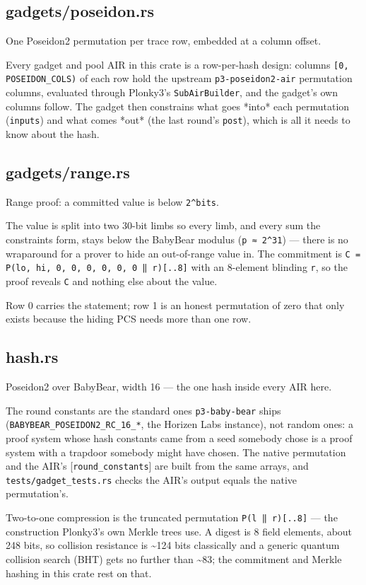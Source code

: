 \documentclass[11pt,a4paper]{article}
\begin{document}
\subsection{gadgets/poseidon.rs}
One Poseidon2 permutation per trace row, embedded at a column offset.

Every gadget and pool AIR in this crate is a row-per-hash design: columns
\texttt{[0, POSEIDON\_COLS)} of each row hold the upstream \texttt{p3-poseidon2-air}
permutation columns, evaluated through Plonky3's \texttt{SubAirBuilder}, and the
gadget's own columns follow. The gadget then constrains what goes *into*
each permutation (\texttt{inputs}) and what comes *out* (the last round's
\texttt{post}), which is all it needs to know about the hash.

\subsection{gadgets/range.rs}
Range proof: a committed value is below \texttt{2\textasciicircum{}bits}.

The value is split into two 30-bit limbs so every limb, and every sum the
constraints form, stays below the BabyBear modulus (\texttt{p ≈ 2\textasciicircum{}31}) — there is
no wraparound for a prover to hide an out-of-range value in. The
commitment is \texttt{C = P(lo, hi, 0, 0, 0, 0, 0, 0 ‖ r)[..8]} with an 8-element
blinding \texttt{r}, so the proof reveals \texttt{C} and nothing else about the value.

Row 0 carries the statement; row 1 is an honest permutation of zero that
only exists because the hiding PCS needs more than one row.

\subsection{hash.rs}
Poseidon2 over BabyBear, width 16 — the one hash inside every AIR here.

The round constants are the standard ones \texttt{p3-baby-bear} ships
(\texttt{BABYBEAR\_POSEIDON2\_RC\_16\_*}, the Horizen Labs instance), not random
ones: a proof system whose hash constants came from a seed somebody chose
is a proof system with a trapdoor somebody might have chosen. The native
permutation and the AIR's [\texttt{round\_constants}] are built from the same
arrays, and \texttt{tests/gadget\_tests.rs} checks the AIR's output equals the
native permutation's.

Two-to-one compression is the truncated permutation \texttt{P(l ‖ r)[..8]} — the
construction Plonky3's own Merkle trees use. A digest is 8 field elements,
about 248 bits, so collision resistance is \textasciitilde{}124 bits classically and a
generic quantum collision search (BHT) gets no further than \textasciitilde{}83; the
commitment and Merkle hashing in this crate rest on that.
\end{document}
